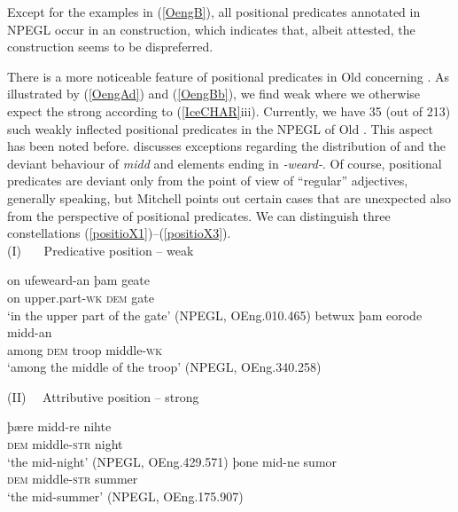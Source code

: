 \documentclass[output=paper,colorlinks,citecolor=brown]{langscibook}
\begin{document}
Except for the examples in (\ref{OengB}), all positional predicates annotated in NPEGL occur in an  construction, which indicates that, albeit attested, the  construction seems to be dispreferred. 

There is a more noticeable feature of positional predicates in Old  concerning . As illustrated by (\ref{OengAd}) and (\ref{OengBb}), we find weak  where we otherwise expect the strong  according to (\ref{IceCHAR}iii).  
Currently, we have 35 (out of 213) such weakly inflected positional predicates in the NPEGL  of Old . This aspect has been noted before.  \citet[vol. I, 70]{Mitchell85} discusses exceptions regarding the distribution of  and the deviant behaviour of \textit{midd} and elements ending in \textit{-weard-}. Of course, positional predicates are deviant only from the point of view of ``regular'' adjectives, generally speaking, but Mitchell points out certain cases that are unexpected also from the perspective of positional predicates. We can distinguish three constellations (\ref{positioX1})--(\ref{positioX3}). \\

\noindent (I) \ \ \  Predicative position -- weak   
\begin{exe}
   \ex \label{positioX1}  
    \begin{xlist}
      \ex \gll on ufeweard-an þam geate \\  
      on upper.part-\textsc{wk} \textsc{dem} gate \\ 
      \glt `in the upper part of the gate' (NPEGL, OEng.010.465)        
      \ex \gll  betwux þam eorode midd-an  \\ 
       among \textsc{dem} troop middle-\textsc{wk}  \\ 
      \glt `among the middle of the troop' (NPEGL, OEng.340.258)
   \end{xlist}
\end{exe} 

\noindent (II)  \ \  Attributive position -- strong   
\begin{exe}
   \ex \label{positioX2}  
    \begin{xlist}
     \ex \gll þære midd-re nihte \\
       \textsc{dem} middle-\textsc{str} night  \\ 
      \glt `the mid-night' (NPEGL, OEng.429.571)  
     \ex \gll þone mid-ne sumor    \\ 
       \textsc{dem} middle-\textsc{str}  summer     \\ 
      \glt `the mid-summer' (NPEGL,  OEng.175.907) 
   \end{xlist}
\end{exe} 
\end{document}
